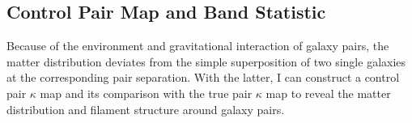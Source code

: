 \documentclass[11pt,letterpaper]{article}
\begin{document}

\subsection{Control Pair Map and Band Statistic}
\label{sec:control}

Because of the environment and gravitational interaction of galaxy pairs, the matter distribution deviates from the simple superposition of two single galaxies at the corresponding pair separation. With the latter, I can construct a control pair $\kappa$ map and its comparison with the true pair $\kappa$ map to reveal the matter distribution and filament structure around galaxy pairs.
\end{document}

